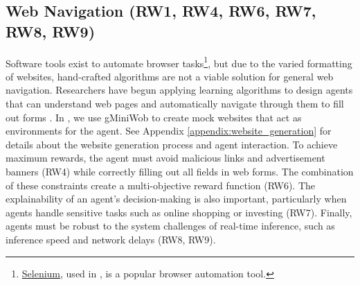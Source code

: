 \subsection{Web Navigation (RW1, RW4, RW6, RW7, RW8, RW9)}
\vspace{-0.5em}
Software tools exist to automate browser tasks\footnote{\href{https://www.selenium.dev/documentation/webdriver/}{Selenium}, used in \method, is a popular browser automation tool.}, but due to the varied formatting of websites, hand-crafted algorithms are not a viable solution for general web navigation.
Researchers have begun applying learning algorithms to design agents that can understand web pages \citep{gur2022understanding_html_llm} and automatically navigate through them to fill out forms \citep{gur2021environment, gur2018learning_to_navigate_the_web}.
In \method, we use gMiniWob \cite{gur2021environment} to create mock websites that act as environments for the agent.
See Appendix \ref{appendix:website_generation} for details about the website generation process and agent interaction.
To achieve maximum rewards, the agent must avoid malicious links and advertisement banners (RW4) while correctly filling out all fields in web forms.
The combination of these constraints create a multi-objective reward function (RW6).
The explainability of an agent's decision-making is also important, particularly when agents handle sensitive tasks such as online shopping or investing (RW7).
Finally, agents must be robust to the system challenges of real-time inference, such as inference speed and network delays (RW8, RW9).


